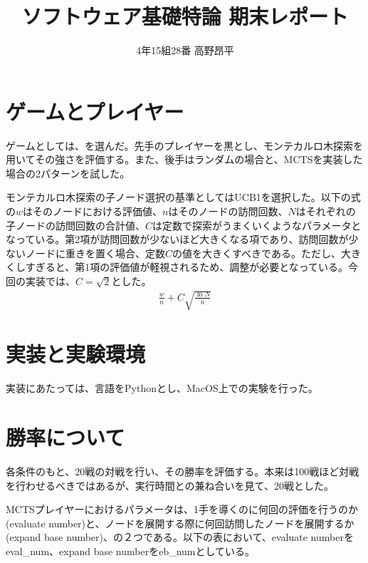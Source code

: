 \documentclass{jsarticle}
\title{ソフトウェア基礎特論 期末レポート}
\author{4年15組28番 高野昂平}
\date{}
\begin{document}
\maketitle
\section{ゲームとプレイヤー}
ゲームとしては、を選んだ。先手のプレイヤーを黒とし、モンテカルロ木探索を用いてその強さを評価する。また、後手はランダムの場合と、MCTSを実装した場合の2パターンを試した。\par
モンテカルロ木探索の子ノード選択の基準としてはUCB1を選択した。以下の式の$w$はそのノードにおける評価値、$n$はそのノードの訪問回数、$N$はそれぞれの子ノードの訪問回数の合計値、$C$は定数で探索がうまくいくようなパラメータとなっている。第2項が訪問回数が少ないほど大きくなる項であり、訪問回数が少ないノードに重きを置く場合、定数$C$の値を大きくすべきである。ただし、大きくしすぎると、第1項の評価値が軽視されるため、調整が必要となっている。今回の実装では、$C=\sqrt{2}$とした。
\begin{eqnarray}
    \frac{w}{n} + C\sqrt{\frac{\ln{N}}{n}} \nonumber
\end{eqnarray}
\section{実装と実験環境}
実装にあたっては、言語をPythonとし、MacOS上での実験を行った。
\section{勝率について}
各条件のもと、20戦の対戦を行い、その勝率を評価する。本来は100戦ほど対戦を行わせるべきではあるが、実行時間との兼ね合いを見て、20戦とした。\par
MCTSプレイヤーにおけるパラメータは、1手を導くのに何回の評価を行うのか(evaluate number)と、ノードを展開する際に何回訪問したノードを展開するか(expand base number)、の２つである。以下の表において、evaluate numberをeval\_num、expand base numberをeb\_numとしている。
\newpage
\end{document}
